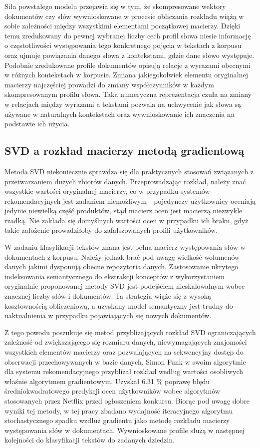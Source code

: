 \documentclass{pracamgr}
\begin{document}
Siła powstałego modelu przejawia się w tym, że skompresowane wektory dokumentów czy słów wywnioskowane w procesie obliczania rozkładu wiążą w sobie zależności między wszystkimi elementami początkowej macierzy. Dzięki temu zredukowany do pewnej wybranej liczby cech profil słowa niesie informację o częstotliwości występowania tego konkretnego pojęcia w tekstach z korpusu oraz ujmuje powiązania danego słowa z kontekstami, gdzie dane słowo występuje. Podobnie zredukowane profile dokumentów opisują relacje z wyrazami obecnymi w różnych kontekstach w korpusie. Zmiana jakiegokolwiek elementu oryginalnej macierzy najczęściej prowadzi do zmiany współczynników w każdym skompresowanym profilu słowa. Taka numeryczna reprezentacja czuła na zmiany w relacjach między wyrazami a tekstami pozwala na uchwycenie jak słowa są używane w naturalnych kontekstach oraz wywnioskowanie ich znaczenia na podstawie ich użycia.

\subsection{SVD a rozkład macierzy metodą gradientową}
Metoda SVD niekoniecznie sprawdza się dla praktycznych stosowań związanych z przetwarzaniem dużych zbiorów danych. Przeprowadzając rozkład, należy znać wszystkie wartości oryginalnej macierzy, co w przypadku systemów rekomendacyjnych jest zadaniem niemożliwym - pojedynczy użytkownicy oceniają jedynie niewielką część produktów, stąd macierz ocen jest macierzą niezwykle rzadką. Nie zakłada się domyślnych wartości ocen w przypadku ich braku, gdyż takie założenie prowadziłoby do zafałszowanych profili użytkowników. 

W zadaniu klasyfikacji tekstów znana jest pełna macierz występowania słów w dokumentach z korpusu. Należy jednak brać pod uwagę wielkość wolumenów danych jakimi dysponują obecne repozytoria danych. Zastosowanie ukrytego indeksowania semantycznego do ekstrakcji konceptów z wykorzystaniem oryginalnie proponowanej metody SVD jest podejściem nieskalowalnym wobec znacznej liczby słów i dokumentów. Ta strategia wiąże się z wysoką kosztownością obliczeniową, a uzyskany model semantyczny jest trudny do uaktualnienia w przypadku pojawiających się nowych dokumentów.

Z tego powodu poszukuje się metod przybliżających rozkład SVD ograniczających zależność od zwiększającego się rozmiaru danych, niewymagających znajomości wszystkich elementów macierzy oraz pozwalających na sekwencyjny dostęp do obserwacji przechowywanych w bazie danych. Simon Funk w swoim algorytmie dla systemu rekomendacyjnego przybliżał rozkład według wartości osobliwych właśnie algorytmem gradientowym. Uzyskał 6.31 \% poprawę błędu średniokwadratowego predykcji ocen użytkowników wobec algorytmów stosowanych przez Netflix przed ogłoszeniem konkursu. Biorąc pod uwagę dobre wyniki tej metody, w tej pracy zbadano wydajność iteracyjnego algorytmu stochastycznego spadku wzdłuż gradientu jako metodę rozkładu macierzy występowania słów w dokumentach. Wywnioskowane profile służą w następnej kolejności do klasyfikacji tekstów do zadanych dziedzin.
\end{document}
